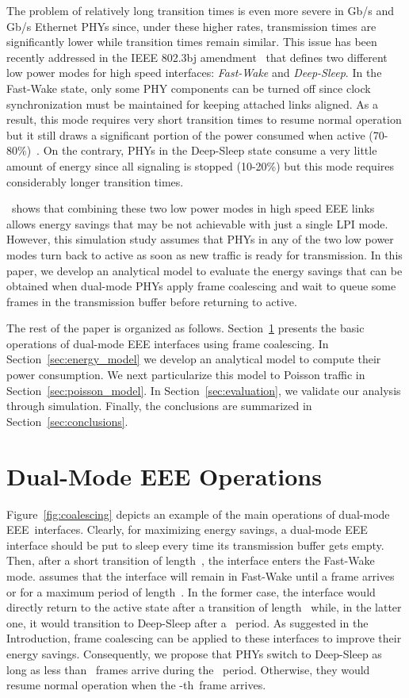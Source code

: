 \documentclass[journal,10pt,letterpaper]{IEEEtran}
\begin{document}
The problem of relatively long transition times is even more severe in
Gb/s and Gb/s Ethernet PHYs since, under these higher
rates, transmission times are significantly lower while transition
times remain similar. This issue has been recently addressed in the
IEEE 802.3bj amendment~\cite{802.3bj} that defines two different low
power modes for high speed interfaces: \emph{Fast-Wake} and
\emph{Deep-Sleep}. In the Fast-Wake state, only some PHY components
can be turned off since clock synchronization must be maintained for
keeping attached links aligned. As a result, this mode requires very
short transition times to resume normal operation but it still draws a
significant portion of the power consumed when active
(70-80\%)~\cite{barrass12:_options_100g}. On the contrary, PHYs in the
Deep-Sleep state consume a very little amount of energy since all
signaling is stopped (10-20\%) but this mode requires considerably
longer transition times.

\cite{mostowfi15:dual_mode_eee}~shows that combining these two low
power modes in high speed EEE links allows energy savings that may be
not achievable with just a single LPI mode. However, this simulation
study assumes that PHYs in any of the two low power modes turn back to
active as soon as new traffic is ready for transmission. In this
paper, we develop an analytical model to evaluate the energy savings
that can be obtained when dual-mode PHYs apply frame coalescing and
wait to queue some frames in the transmission buffer before returning
to active.

The rest of the paper is organized as
follows. Section~\ref{sec:coalescing} presents the basic operations of
dual-mode EEE interfaces using frame coalescing. In
Section~\ref{sec:energy_model} we develop an analytical model to
compute their power consumption. We next particularize this model to
Poisson traffic in Section~\ref{sec:poisson_model}. In
Section~\ref{sec:evaluation}, we validate our analysis through
simulation. Finally, the conclusions are summarized in
Section~\ref{sec:conclusions}.

\section{Dual-Mode EEE Operations}
\label{sec:coalescing}

Figure~\ref{fig:coalescing} depicts an example of the main operations
of dual-mode EEE~interfaces. Clearly, for maximizing energy savings, a
dual-mode EEE interface should be put to sleep every time its
transmission buffer gets empty. Then, after a short transition of
length~, the interface enters the Fast-Wake
mode. \cite{mostowfi15:dual_mode_eee} assumes that the interface will
remain in Fast-Wake until a frame arrives or for a maximum period of
length~. In the former case, the interface would
directly return to the active state after a transition of
length~ while, in the latter one, it would
transition to Deep-Sleep after a ~period. As
suggested in the Introduction, frame coalescing can be applied to
these interfaces to improve their energy savings. Consequently, we
propose that PHYs switch to Deep-Sleep as long as less than
~frames arrive during the
~period. Otherwise, they would resume normal
operation when the -th~frame arrives.
\end{document}
